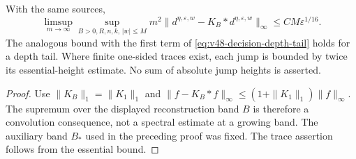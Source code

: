 \begin{corollary}
\label{cor:v48-decision-all-band}
With the same sources,
\begin{equation}\label{eq:v48-decision-all-band}
 \limsup_{m\to\infty}\sup_{B>0,R,n,k,\,|w|\le M}
 m^2\|d^{\eta,\varepsilon,w}-K_B*d^{\eta,\varepsilon,w}\|_\infty
                                  \le CM\varepsilon^{1/16}.
\end{equation}
The analogous bound with the first term of
\eqref{eq:v48-decision-depth-tail} holds for a depth tail.
Where finite one-sided traces exist, each jump is bounded by twice
its essential-height estimate. No sum of absolute jump heights is
asserted.
\end{corollary}
\begin{proof}
Use $\|K_B\|_1=\|K_1\|_1$ and
$\|f-K_B*f\|_\infty\le(1+\|K_1\|_1)\|f\|_\infty$.
The supremum over the displayed reconstruction band $B$ is therefore
a convolution consequence, not a spectral estimate at a growing
band. The auxiliary band $B_*$ used in the preceding proof was fixed.
The trace assertion follows from the essential bound.
\end{proof}
